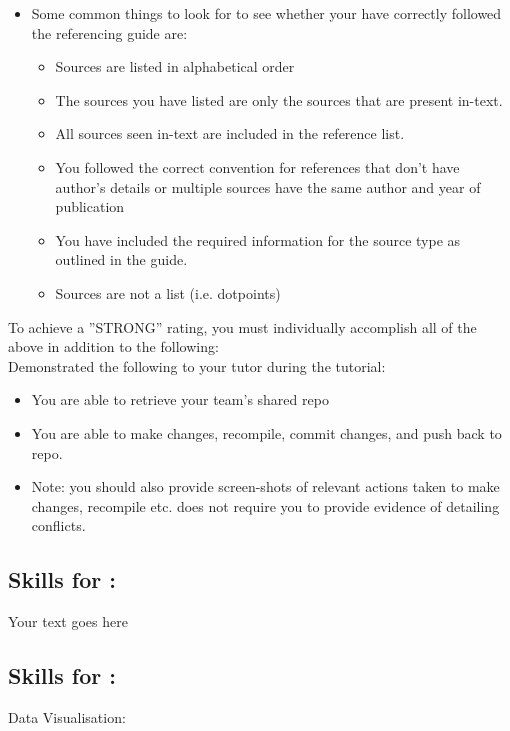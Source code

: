 \documentclass[a4paper, 11pt]{report}
\begin{document}
\begin{itemize}
\begin{itemize}
	\item Some common things to look for to see whether your have correctly followed the referencing guide are:
		\begin{itemize}
		\item Sources are listed in alphabetical order
		\item The sources you have listed are only the sources that are present in-text.
		\item All sources seen in-text are included in the reference list.
		\item You followed the correct convention for references that don’t have author’s details or multiple sources have the same author and year of publication
		\item You have included the required information for the source type as outlined in the guide.
		\item Sources are not a list (i.e. dotpoints)
		\end{itemize}
	\end{itemize}
\end{itemize}

To achieve a ''STRONG'' rating, you must individually accomplish all of the above in addition to the following:\\
Demonstrated the following to your tutor during the tutorial:
\begin{itemize}
\item You are able to retrieve your team’s shared repo
\item You are able to make changes, recompile, commit changes, and push back to repo.
\item Note: you should also provide screen-shots of relevant actions taken to make changes, recompile etc. does not require you to provide evidence of detailing conflicts.
\end{itemize}



\subsection{Skills for \majA: \studA}

Your text goes here

\subsection{Skills for \majB: \studB}

Data Visualisation:
\end{document}
